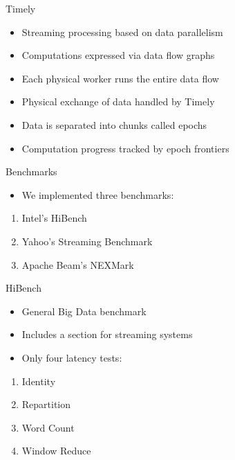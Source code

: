 \documentclass[14pt,t]{beamer}
\renewcommand{\title}[1]{
  {\huge #1} \vskip 0.4cm
}
\begin{document}
\begin{frame}
  \title{Timely}
  \begin{itemize}
  \item Streaming processing based on data parallelism
  \item Computations expressed via data flow graphs
  \item Each physical worker runs the entire data flow
  \item Physical exchange of data handled by Timely
  \item Data is separated into chunks called epochs
  \item Computation progress tracked by epoch frontiers
  \end{itemize}
\end{frame}

\begin{frame}
  \title{Benchmarks}
  \begin{itemize}
  \item We implemented three benchmarks:
  \end{itemize}
  \begin{enumerate}
  \item Intel's HiBench
  \item Yahoo's Streaming Benchmark
  \item Apache Beam's NEXMark
  \end{enumerate}
\end{frame}

\begin{frame}
  \title{HiBench}
  \begin{itemize}
  \item General Big Data benchmark
  \item Includes a section for streaming systems
  \item Only four latency tests:
  \end{itemize}
  \begin{enumerate}
  \item Identity \hfill{}
  \item Repartition \hfill{}
  \item Word Count \hfill{}
  \item Window Reduce \hfill{}
  \end{enumerate}
\end{frame}
\end{document}
